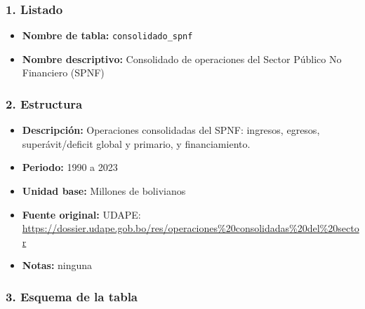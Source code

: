 \documentclass[12pt,a4paper]{article}
\begin{document}
\subsubsection*{1. Listado}
\begin{itemize}
  \item \textbf{Nombre de tabla:} \texttt{consolidado\_spnf}
  \item \textbf{Nombre descriptivo:} Consolidado de operaciones del Sector Público No Financiero (SPNF)
\end{itemize}

\subsubsection*{2. Estructura}
\begin{itemize}
  \item \textbf{Descripción:} Operaciones consolidadas del SPNF: ingresos, egresos, superávit/deficit global y primario, y financiamiento.
  \item \textbf{Periodo:} 1990 a 2023
  \item \textbf{Unidad base:} Millones de bolivianos
  \item \textbf{Fuente original:} UDAPE:\\
    \url{https://dossier.udape.gob.bo/res/operaciones%20consolidadas%20del%20sector}
  \item \textbf{Notas:} ninguna
\end{itemize}

\subsubsection*{3. Esquema de la tabla}
\end{document}
